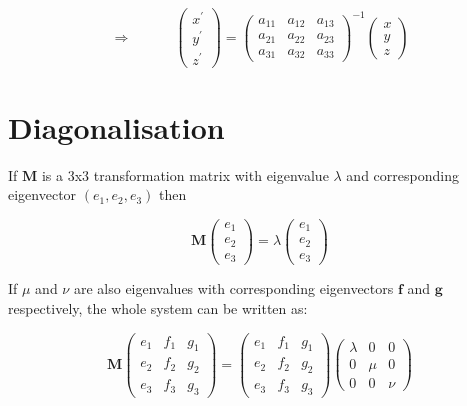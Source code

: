 \documentclass[a5paper]{article}
\begin{document}
\begin{equation}
   \Rightarrow \hspace{3em} \left(
  \begin{array}{c}
    x^\prime\\ y^\prime\\ z^\prime
  \end{array} \right) =
  \left(
  \begin{array}{ccc}
    a_{11} & a_{12} &a_{13} \\
    a_{21} & a_{22} &a_{23} \\
    a_{31} & a_{32} &a_{33}
  \end{array} \right)^{-1}
  \left(
  \begin{array}{c}
    x\\ y\\ z
  \end{array} \right)
\end{equation}
\section*{Diagonalisation}

If $\bm{M}$ is a 3x3 transformation matrix with eigenvalue $\lambda$ and
corresponding eigenvector $(e_1, e_2, e_3)$ then

\begin{equation}
  \bm{M}
  \left( \begin{array}{c}
    e_1\\
    e_2\\
    e_3
  \end{array} \right) = \lambda
  \left( \begin{array}{c}
    e_1\\
    e_2\\
    e_3
  \end{array} \right)
\end{equation}

If $\mu$ and $\nu$ are also eigenvalues with corresponding eigenvectors
$\bm{f}$ and $\bm{g}$ respectively, the whole system can be written as:

\begin{equation}
  \bm{M}
  \left( \begin{array}{ccc}
    e_1 & f_1 & g_1\\
    e_2 & f_2 & g_2\\
    e_3 & f_3 & g_3
  \end{array} \right) =
  \left( \begin{array}{ccc}
    e_1 & f_1 & g_1\\
    e_2 & f_2 & g_2\\
    e_3 & f_3 & g_3
  \end{array} \right)
  \left( \begin{array}{ccc}
    \lambda & 0 & 0\\
    0 & \mu & 0\\
    0 & 0 & \nu
  \end{array} \right)
\end{equation}
\end{document}

